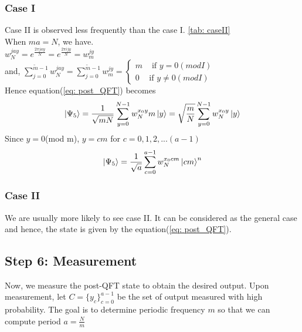 \subsubsection{Case I}
Case II is observed less frequently than the case I. \ref{tab: caseII}
\\When $ ma = N$, we have.
\\$w_N ^{j a y} = e^{\frac{2 \pi j a y}{N}} = e^{\frac{2 \pi i j y}{N}} = w_{m} ^{j y}$
\\and, $\sum_{j=0}^{ \tilde{m}-1} w_N ^{j a y} = \sum_{j=0}^{\tilde{m} -1} w_{m}^{j y} =
\begin{cases}
m & \text{ if $y = 0(mod I)$}\\
0  & \text{if $y \neq 0(mod I)$}
\end{cases}
$
\\Hence equation(\ref{eq: post_QFT}) becomes 
\begin{equation*}
   \ket{\Psi_5} = \frac{1}{\sqrt{mN}} \sum_{y=0}^{N-1} w_N ^{x_0 y} m \ket{y} = \sqrt{\frac{m}{N}} \sum_{y=0}^{N-1} w_N^{x_0 y} \ket{y}
\end{equation*}
Since $y=0$(mod m), $y=cm$ for $c=0, 1, 2, . . .(a-1)$
\begin{equation}
   \ket{\Psi_5} = \frac{1}{\sqrt{a}} \sum_{c=0}^{a-1} w_N^{x_0 c m} \ket{cm}^n
    \label{eq: post_QFT_caseI}
\end{equation}
\subsubsection{Case II}
We are usually more likely to see case II. It can be considered as the general case and hence, the state is given by the equation(\ref{eq: post_QFT}).

\subsection{Step 6: Measurement} \label{sub: step6}
Now, we measure the post-QFT state to obtain the desired output. Upon measurement, let $C=\{y_c\}_{c=0}^{a-1}$ be the set of output measured with high probability. The goal is to determine periodic frequency $m$ so that we can compute period $a= \frac{N}{m}$

